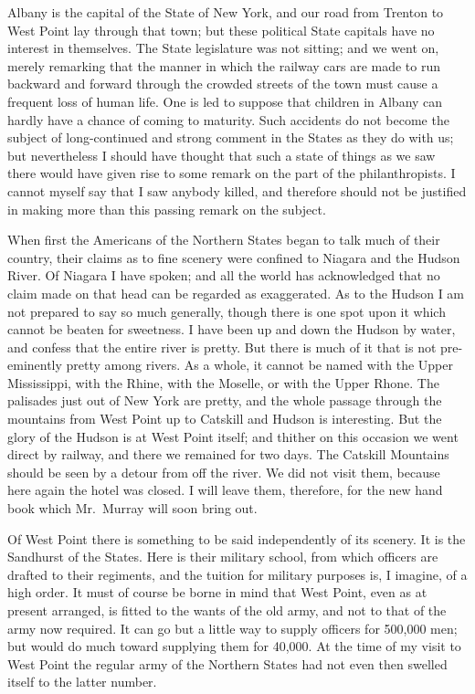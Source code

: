 Albany is the capital of the State of New York, and our road from
Trenton to West Point lay through that town; but these political
State capitals have no interest in themselves.  The State
legislature was not sitting; and we went on, merely remarking that
the manner in which the railway cars are made to run backward and
forward through the crowded streets of the town must cause a
frequent loss of human life.  One is led to suppose that children
in Albany can hardly have a chance of coming to maturity.  Such
accidents do not become the subject of long-continued and strong
comment in the States as they do with us; but nevertheless I should
have thought that such a state of things as we saw there would have
given rise to some remark on the part of the philanthropists.  I
cannot myself say that I saw anybody killed, and therefore should
not be justified in making more than this passing remark on the
subject.

When first the Americans of the Northern States began to talk much
of their country, their claims as to fine scenery were confined to
Niagara and the Hudson River.  Of Niagara I have spoken; and all
the world has acknowledged that no claim made on that head can be
regarded as exaggerated.  As to the Hudson I am not prepared to say
so much generally, though there is one spot upon it which cannot be
beaten for sweetness.  I have been up and down the Hudson by water,
and confess that the entire river is pretty.  But there is much of
it that is not pre-eminently pretty among rivers.  As a whole, it
cannot be named with the Upper Mississippi, with the Rhine, with
the Moselle, or with the Upper Rhone.  The palisades just out of
New York are pretty, and the whole passage through the mountains
from West Point up to Catskill and Hudson is interesting.  But the
glory of the Hudson is at West Point itself; and thither on this
occasion we went direct by railway, and there we remained for two
days.  The Catskill Mountains should be seen by a detour from off
the river.  We did not visit them, because here again the hotel was
closed.  I will leave them, therefore, for the new hand book which
Mr.\ Murray will soon bring out.

Of West Point there is something to be said independently of its
scenery.  It is the Sandhurst of the States.  Here is their
military school, from which officers are drafted to their
regiments, and the tuition for military purposes is, I imagine, of
a high order.  It must of course be borne in mind that West Point,
even as at present arranged, is fitted to the wants of the old
army, and not to that of the army now required.  It can go but a
little way to supply officers for 500,000 men; but would do much
toward supplying them for 40,000.  At the time of my visit to West
Point the regular army of the Northern States had not even then
swelled itself to the latter number.

